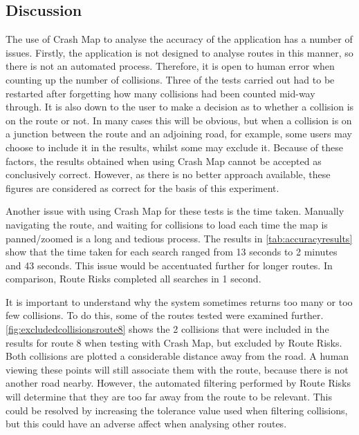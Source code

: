 \documentclass[authoryearcitations]{UoYCSproject}
\begin{document}
\subsection{Discussion}

The use of Crash Map to analyse the accuracy of the application has a number of issues. Firstly, the application is not designed to analyse routes in this manner, so there is not an automated process. Therefore, it is open to human error when counting up the number of collisions. Three of the tests carried out had to be restarted after forgetting how many collisions had been counted mid-way through. It is also down to the user to make a decision as to whether a collision is on the route or not. In many cases this will be obvious, but when a collision is on a junction between the route and an adjoining road, for example, some users may choose to include it in the results, whilst some may exclude it. Because of these factors, the results obtained when using Crash Map cannot be accepted as conclusively correct. However, as there is no better approach available, these figures are considered as correct for the basis of this experiment.

Another issue with using Crash Map for these tests is the time taken. Manually navigating the route, and waiting for collisions to load each time the map is panned/zoomed is a long and tedious process. The results in \autoref{tab:accuracyresults} show that the time taken for each search ranged from 13 seconds to 2 minutes and 43 seconds. This issue would be accentuated further for longer routes. In comparison, Route Risks completed all searches in 1 second. 

It is important to understand why the system sometimes returns too many or too few collisions. To do this, some of the routes tested were examined further. \autoref{fig:excludedcollisionsroute8} shows the 2 collisions that were included in the results for route 8 when testing with Crash Map, but excluded by Route Risks. Both collisions are plotted a considerable distance away from the road. A human viewing these points will still associate them with the route, because there is not another road nearby. However, the automated filtering performed by Route Risks will determine that they are too far away from the route to be relevant. This could be resolved by increasing the tolerance value used when filtering collisions, but this could have an adverse affect when analysing other routes.
\end{document}
